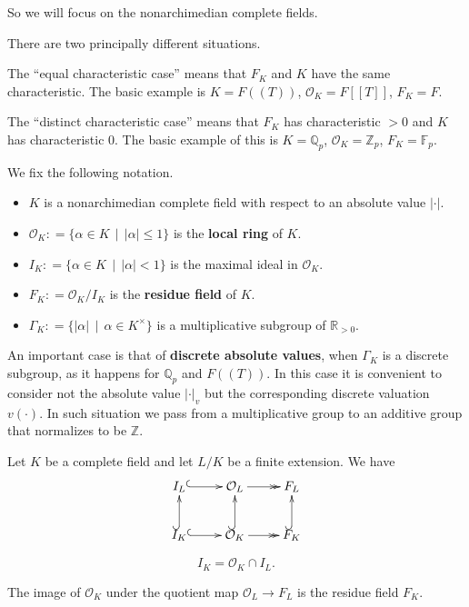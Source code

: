 \documentclass{article}
\newcommand{\term}{\textbf}
\newcommand{\dfn}{\mathrel{\mathop:}=}
\newcommand{\ZZ}{\mathbb{Z}}
\newcommand{\FF}{\mathbb{F}}
\newcommand{\QQ}{\mathbb{Q}}
\renewcommand{\O}{\mathcal{O}}
\newcommand{\examplesymbol}{$\blacktriangle$}
\renewcommand{\qedsymbol}{$\blacksquare$}
\theoremstyle{myplain}
\theoremstyle{mydefinition}
\newenvironment{example}
  {\pushQED{\qed}\renewcommand{\qedsymbol}{\examplesymbol}\examplex}
  {\popQED\endexamplex}
\begin{document}
So we will focus on the nonarchimedian complete fields.

\begin{example}
  There are two principally different situations.

  The ``equal characteristic case'' means that $F_K$ and $K$ have the same
  characteristic. The basic example is $K = F (\!(T)\!)$, $\O_K = F [\![T]\!]$,
  $F_K = F$.

  The ``distinct characteristic case'' means that $F_K$ has characteristic $> 0$
  and $K$ has characteristic $0$. The basic example of this is $K = \QQ_p$,
  $\O_K = \ZZ_p$, $F_K = \FF_p$.
\end{example}

We fix the following notation.

\begin{itemize}
\item $K$ is a nonarchimedian complete field with respect to an absolute value
  $|\cdot|$.

\item $\O_K \dfn \{ \alpha \in K \,\mid\, |\alpha| \le 1 \}$ is the
  \term{local ring} of $K$.

\item $I_K \dfn \{ \alpha \in K \,\mid\, |\alpha| < 1 \}$ is the maximal ideal
  in $\O_K$.

\item $F_K \dfn \O_K/I_K$ is the \term{residue field} of $K$.

\item $\Gamma_K \dfn \{ |\alpha| \,\mid\, \alpha \in K^\times \}$ is a
  multiplicative subgroup of $\mathbb{R}_{> 0}$.
\end{itemize}

An important case is that of \term{discrete absolute values}, when $\Gamma_K$ is
a discrete subgroup, as it happens for $\QQ_p$ and $F (\!(T)\!)$. In this case
it is convenient to consider not the absolute value $|\cdot|_v$ but the
corresponding discrete valuation $v (\cdot)$. In such situation we pass from a
multiplicative group to an additive group that normalizes to be $\ZZ$.

Let $K$ be a complete field and let $L/K$ be a finite extension. We have
\[ \xymatrix{
    I_L\ar@{^(->}[r] & \O_L\ar@{->>}[r] & F_L \\
    I_K\ar@{^(->}[r]\ar@{^(->}[u] & \O_K\ar@{->>}[r]\ar@{^(->}[u] & F_K\ar@{^(->}[u]
  } \]

\[ I_K = \O_K \cap I_L. \]

The image of $\O_K$ under the quotient map $\O_L \to F_L$ is the residue field
$F_K$.
\end{document}
